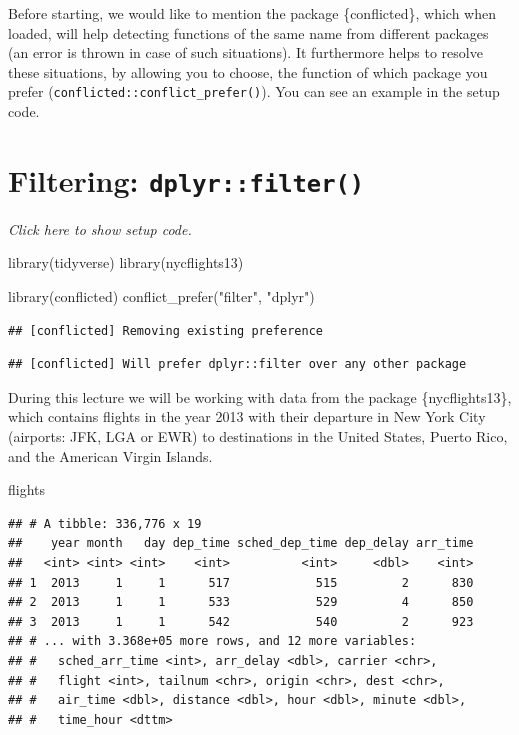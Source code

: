 \documentclass[]{book}
\newenvironment{Shaded}{}{}
\newcommand{\KeywordTok}[1]{\textcolor[rgb]{0.00,0.00,1.00}{#1}}
\newcommand{\NormalTok}[1]{#1}
\newcommand{\StringTok}[1]{\textcolor[rgb]{0.00,0.50,0.50}{#1}}
\begin{document}
Before starting, we would like to mention the package \{conflicted\}, which when loaded, will help detecting functions of the same name from different packages (an error is thrown in case of such situations).
It furthermore helps to resolve these situations, by allowing you to choose, the function of which package you prefer (\texttt{conflicted::conflict\_prefer()}).
You can see an example in the setup code.

\hypertarget{filtering-dplyrfilter}{%
\section{\texorpdfstring{Filtering: \texttt{dplyr::filter()}}{Filtering: dplyr::filter()}}\label{filtering-dplyrfilter}}

\emph{Click here to show setup code.}

\begin{Shaded}
\begin{Highlighting}[]
\KeywordTok{library}\NormalTok{(tidyverse)}
\KeywordTok{library}\NormalTok{(nycflights13)}

\KeywordTok{library}\NormalTok{(conflicted)}
\KeywordTok{conflict_prefer}\NormalTok{(}\StringTok{"filter"}\NormalTok{, }\StringTok{"dplyr"}\NormalTok{)}
\end{Highlighting}
\end{Shaded}

\begin{verbatim}
## [conflicted] Removing existing preference
\end{verbatim}

\begin{verbatim}
## [conflicted] Will prefer dplyr::filter over any other package
\end{verbatim}

During this lecture we will be working with data from the package \{nycflights13\}, which contains flights in the year 2013 with their departure in New York City (airports: JFK, LGA or EWR) to destinations in the United States, Puerto Rico, and the American Virgin Islands.

\begin{Shaded}
\begin{Highlighting}[]
\NormalTok{flights}
\end{Highlighting}
\end{Shaded}

\begin{verbatim}
## # A tibble: 336,776 x 19
##    year month   day dep_time sched_dep_time dep_delay arr_time
##   <int> <int> <int>    <int>          <int>     <dbl>    <int>
## 1  2013     1     1      517            515         2      830
## 2  2013     1     1      533            529         4      850
## 3  2013     1     1      542            540         2      923
## # ... with 3.368e+05 more rows, and 12 more variables:
## #   sched_arr_time <int>, arr_delay <dbl>, carrier <chr>,
## #   flight <int>, tailnum <chr>, origin <chr>, dest <chr>,
## #   air_time <dbl>, distance <dbl>, hour <dbl>, minute <dbl>,
## #   time_hour <dttm>
\end{verbatim}
\end{document}

